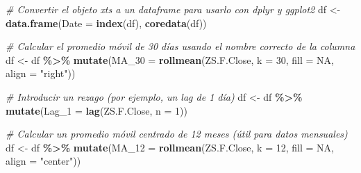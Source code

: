\documentclass[
]{book}
\newenvironment{Shaded}{\begin{snugshade}}{\end{snugshade}}
\newcommand{\AttributeTok}[1]{\textcolor[rgb]{0.13,0.29,0.53}{#1}}
\newcommand{\CommentTok}[1]{\textcolor[rgb]{0.56,0.35,0.01}{\textit{#1}}}
\newcommand{\ConstantTok}[1]{\textcolor[rgb]{0.56,0.35,0.01}{#1}}
\newcommand{\DecValTok}[1]{\textcolor[rgb]{0.00,0.00,0.81}{#1}}
\newcommand{\FunctionTok}[1]{\textcolor[rgb]{0.13,0.29,0.53}{\textbf{#1}}}
\newcommand{\NormalTok}[1]{#1}
\newcommand{\OtherTok}[1]{\textcolor[rgb]{0.56,0.35,0.01}{#1}}
\newcommand{\SpecialCharTok}[1]{\textcolor[rgb]{0.81,0.36,0.00}{\textbf{#1}}}
\newcommand{\StringTok}[1]{\textcolor[rgb]{0.31,0.60,0.02}{#1}}
\begin{document}
\begin{Shaded}
\begin{Highlighting}[]
\CommentTok{\# Convertir el objeto xts a un dataframe para usarlo con dplyr y ggplot2}
\NormalTok{df }\OtherTok{\textless{}{-}} \FunctionTok{data.frame}\NormalTok{(}\AttributeTok{Date =} \FunctionTok{index}\NormalTok{(df), }\FunctionTok{coredata}\NormalTok{(df))}

\CommentTok{\# Calcular el promedio móvil de 30 días usando el nombre correcto de la columna}
\NormalTok{df }\OtherTok{\textless{}{-}}\NormalTok{ df }\SpecialCharTok{\%\textgreater{}\%}
  \FunctionTok{mutate}\NormalTok{(}\AttributeTok{MA\_30 =} \FunctionTok{rollmean}\NormalTok{(}\StringTok{\textasciigrave{}}\AttributeTok{ZS.F.Close}\StringTok{\textasciigrave{}}\NormalTok{, }\AttributeTok{k =} \DecValTok{30}\NormalTok{, }\AttributeTok{fill =} \ConstantTok{NA}\NormalTok{, }\AttributeTok{align =} \StringTok{"right"}\NormalTok{))}

\CommentTok{\# Introducir un rezago (por ejemplo, un lag de 1 día)}
\NormalTok{df }\OtherTok{\textless{}{-}}\NormalTok{ df }\SpecialCharTok{\%\textgreater{}\%}
  \FunctionTok{mutate}\NormalTok{(}\AttributeTok{Lag\_1 =} \FunctionTok{lag}\NormalTok{(}\StringTok{\textasciigrave{}}\AttributeTok{ZS.F.Close}\StringTok{\textasciigrave{}}\NormalTok{, }\AttributeTok{n =} \DecValTok{1}\NormalTok{))}

\CommentTok{\# Calcular un promedio móvil centrado de 12 meses (útil para datos mensuales)}
\NormalTok{df }\OtherTok{\textless{}{-}}\NormalTok{ df }\SpecialCharTok{\%\textgreater{}\%}
  \FunctionTok{mutate}\NormalTok{(}\AttributeTok{MA\_12 =} \FunctionTok{rollmean}\NormalTok{(}\StringTok{\textasciigrave{}}\AttributeTok{ZS.F.Close}\StringTok{\textasciigrave{}}\NormalTok{, }\AttributeTok{k =} \DecValTok{12}\NormalTok{, }\AttributeTok{fill =} \ConstantTok{NA}\NormalTok{, }\AttributeTok{align =} \StringTok{"center"}\NormalTok{))}


\end{Highlighting}
\end{Shaded}
\end{document}
